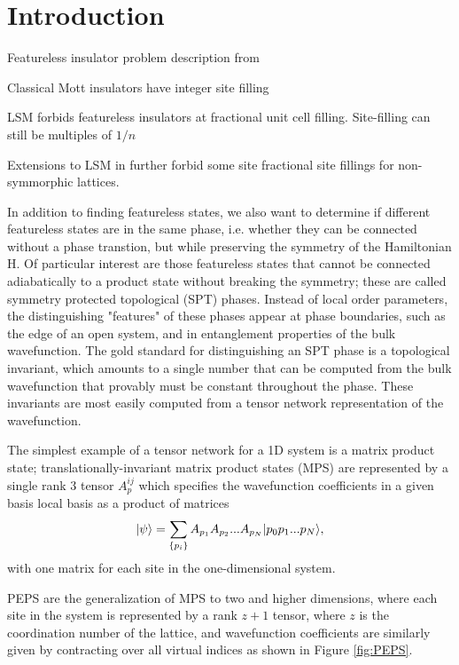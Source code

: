
\section{Introduction}


Featureless insulator problem description from   
\bi 
\item Classical Mott insulators have integer site filling
\item LSM forbids featureless insulators at fractional unit cell 
filling. Site-filling can still be multiples of $1/n$
\item Extensions to LSM in  further 
forbid some site fractional site fillings for non-symmorphic lattices.
\ei 

In addition to finding featureless states, we also want to determine
 if different featureless states are in the same phase, i.e. whether 
 they can be connected without a phase transtion, but while preserving 
 the symmetry of the Hamiltonian H. Of particular interest are those 
 featureless states that cannot be connected adiabatically to a 
 product state without breaking the symmetry; these are called 
 symmetry protected topological (SPT) phases. Instead of local order 
 parameters, the distinguishing "features" of these phases appear at 
 phase boundaries, such as the edge of an open system, and in 
 entanglement properties of the bulk wavefunction. The gold standard 
 for distinguishing an SPT phase is a topological invariant, which 
 amounts to a single number that can be computed from the bulk 
 wavefunction that provably must be constant throughout the phase. 
 These invariants are most easily computed from a tensor network 
 representation of the wavefunction.

The simplest example of a tensor network for a 1D system is a matrix 
product state; translationally-invariant matrix product states (MPS) 
are represented by a single rank 3 tensor $A_p^{ij}$ which specifies 
the wavefunction coefficients in a given basis local basis as a 
product of matrices $$\vert \psi \rangle = \sum\limits_{\{p_i\}} A_{p_1} 
A_{p_2} ... A_{p_N} \vert p_0 p_1 ... p_N \rangle,$$ with one matrix for each 
site in the one-dimensional system.

PEPS are the generalization of MPS to two and higher dimensions, where 
each site in the system is represented by a rank $z+1$ tensor, where 
$z$ is the coordination number of the lattice, and wavefunction 
coefficients are similarly given by contracting over all virtual 
indices as shown in Figure \ref{fig:PEPS}.\cite{verstraete2004}
